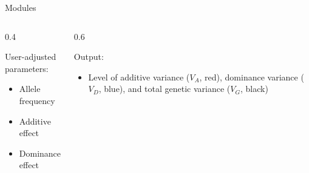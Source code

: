 \documentclass[final]{beamer}
\newlength{\onecolwid}
\newlength{\twocolwid}
\begin{document}
\begin{frame}[t]
\begin{columns}[t]
\begin{column}{\twocolwid}
\begin{block}{Modules}
\begin{columns}[t,totalwidth=\twocolwid]
\begin{column}{\onecolwid}
\vspace{45.46271px}

\vspace{-1cm}

\begin{columns}[t,totalwidth=\onecolwid] %

\begin{column}{0.4\onecolwid} %

User-adjusted parameters:

\begin{itemize}
  \item Allele frequency
  \item Additive effect
  \item Dominance effect
\end{itemize}

\end{column}
\begin{column}{0.6\onecolwid} %

Output:

\begin{itemize}
  \item Level of additive variance ($V_A$, red), dominance variance ($V_D$, blue), and total genetic variance ($V_G$, black)
\end{itemize}


\end{column}
\end{columns}





\end{column} %

\end{columns} %




\end{block}
\end{column}
\end{columns}
\end{frame}
\end{document}
